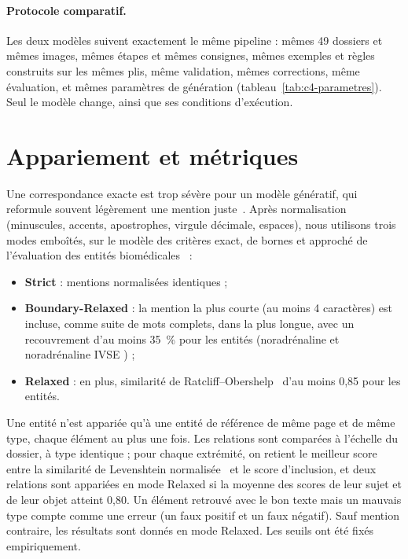 \paragraph{Protocole comparatif.}\label{sec:c4-protocole} Les deux modèles suivent exactement le même pipeline : mêmes 49 dossiers et mêmes images, mêmes étapes et mêmes consignes, mêmes exemples et règles construits sur les mêmes plis, même validation, mêmes corrections, même évaluation, et mêmes paramètres de génération (tableau~\ref{tab:c4-parametres}). Seul le modèle change, ainsi que ses conditions d'exécution.

\section{Appariement et métriques}\label{sec:c4-matching}

Une correspondance exacte est trop sévère pour un modèle génératif, qui reformule souvent légèrement une mention juste~\cite{wadhwa2023revisiting}. Après normalisation (minuscules, accents, apostrophes, virgule décimale, espaces), nous utilisons trois modes emboîtés, sur le modèle des critères exact, de bornes et approché de l'évaluation des entités biomédicales~\cite{tsai2006criteria} :
\begin{itemize}
  \item \textbf{Strict} : mentions normalisées identiques ;
  \item \textbf{Boundary-Relaxed} : la mention la plus courte (au moins 4 caractères) est incluse, comme suite de mots complets, dans la plus longue, avec un recouvrement d'au moins 35~\% pour les entités (\og noradrénaline \fg{} et \og noradrénaline IVSE \fg{}) ;
  \item \textbf{Relaxed} : en plus, similarité de Ratcliff--Obershelp~\cite{ratcliff1988} d'au moins 0,85 pour les entités.
\end{itemize}
Une entité n'est appariée qu'à une entité de référence de même page et de même type, chaque élément au plus une fois. Les relations sont comparées à l'échelle du dossier, à type identique ; pour chaque extrémité, on retient le meilleur score entre la similarité de Levenshtein normalisée~\cite{levenshtein1966,navarro2001} et le score d'inclusion, et deux relations sont appariées en mode Relaxed si la moyenne des scores de leur sujet et de leur objet atteint 0,80. Un élément retrouvé avec le bon texte mais un mauvais type compte comme une erreur (un faux positif et un faux négatif). Sauf mention contraire, les résultats sont donnés en mode Relaxed. Les seuils ont été fixés empiriquement.

